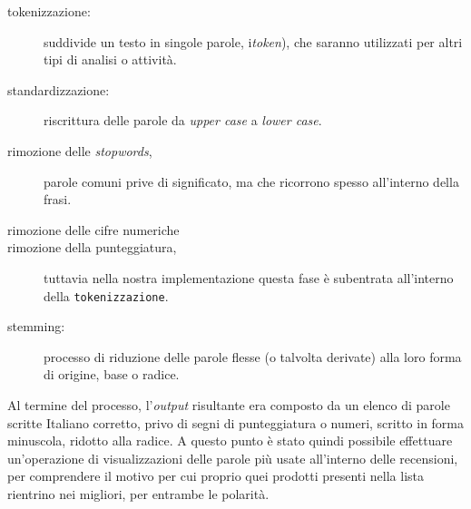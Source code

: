 			\begin{description}
				\item[tokenizzazione:] suddivide un testo in singole parole, i\textit{token}), che saranno utilizzati per altri tipi di analisi o attività.
				\item[standardizzazione:] riscrittura delle parole da \textit{upper case} a \textit{lower case}. 
				\item[rimozione delle \textit{stopwords},] parole comuni prive di significato, ma che ricorrono spesso all'interno della frasi.
				\item[rimozione delle cifre numeriche]
				\item[rimozione della punteggiatura,] tuttavia nella nostra implementazione questa fase è subentrata all'interno della \verb|tokenizzazione|. 
				\item [stemming:] processo di riduzione delle parole flesse (o talvolta derivate) alla loro forma di origine, base o radice.
			\end{description}
			
			Al termine del processo, l'\textit{output} risultante era composto da un elenco di parole scritte Italiano corretto, privo di segni di punteggiatura o numeri, scritto in forma minuscola, ridotto alla radice. A questo punto è stato quindi possibile effettuare un'operazione di visualizzazioni delle parole più usate all'interno delle recensioni, per comprendere il motivo per cui proprio quei prodotti presenti nella lista rientrino nei migliori, per entrambe le polarità.
			
